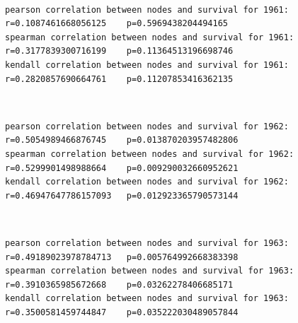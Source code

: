 \documentclass[11pt]{article}
\begin{document}
    \begin{center}
    \end{center}
    { \hspace*{\fill} \\}
    
    \begin{Verbatim}[commandchars=\\\{\}]
pearson correlation between nodes and survival for 1961:
r=0.1087461668056125	p=0.5969438204494165
spearman correlation between nodes and survival for 1961:
r=0.3177839300716199	p=0.11364513196698746
kendall correlation between nodes and survival for 1961:
r=0.2820857690664761	p=0.11207853416362135

    \end{Verbatim}

    \begin{center}
    \end{center}
    { \hspace*{\fill} \\}
    
    \begin{Verbatim}[commandchars=\\\{\}]
pearson correlation between nodes and survival for 1962:
r=0.5054989466876745	p=0.013870203957482806
spearman correlation between nodes and survival for 1962:
r=0.5299901498988664	p=0.009290032660952621
kendall correlation between nodes and survival for 1962:
r=0.46947647786157093	p=0.012923365790573144

    \end{Verbatim}

    \begin{center}
    \end{center}
    { \hspace*{\fill} \\}
    
    \begin{Verbatim}[commandchars=\\\{\}]
pearson correlation between nodes and survival for 1963:
r=0.49189023978784713	p=0.005764992668383398
spearman correlation between nodes and survival for 1963:
r=0.3910365985672668	p=0.03262278406685171
kendall correlation between nodes and survival for 1963:
r=0.3500581459744847	p=0.035222030489057844

    \end{Verbatim}
\end{document}
